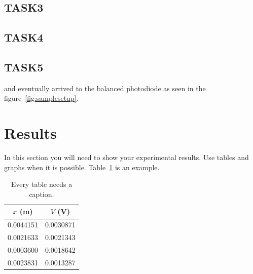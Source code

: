 \documentclass[letterpaper,12pt]{article}
\begin{document}
\subsection{TASK3}

\subsection{TASK4}

\subsection{TASK5}


and eventually arrived to the
balanced photodiode as seen in the figure~\ref{fig:samplesetup}.


\section{Results}

In this section you will need to show your experimental results. Use tables and
graphs when it is possible. Table~\ref{tbl:bins} is an example.

\begin{table}[ht]
\begin{center}
\caption{Every table needs a caption.}
\label{tbl:bins} %
\begin{tabular}{|cc|} 
\hline
\multicolumn{1}{|c}{$x$ (m)} & \multicolumn{1}{c|}{$V$ (V)} \\
\hline
0.0044151 &   0.0030871 \\
0.0021633 &   0.0021343 \\
0.0003600 &   0.0018642 \\
0.0023831 &   0.0013287 \\
\hline
\end{tabular}
\end{center}
\end{table}
\end{document}
